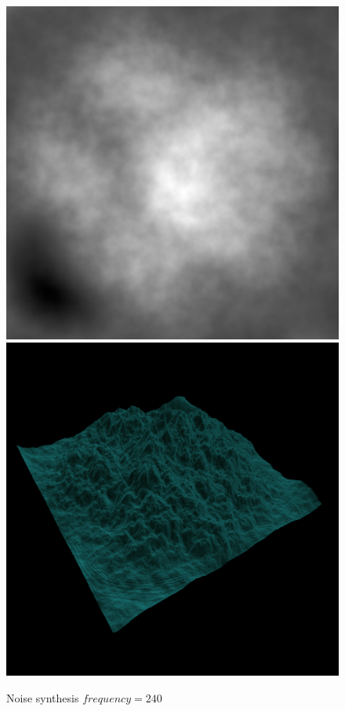 \begin{figure}[H]
	  \\[0.25em]
	  \includegraphics[width=\imagewidth]{images/results/terrains/512-1/simplex/240}
	  \includegraphics[width=\imagewidth]{images/results/terrains/512-1/simplex/240_3d}
	  \caption{Noise synthesis $frequency = 240$}
	  \label{fig:ex-noise240-surface}
	\end{figure}
	  
